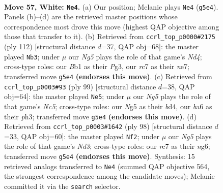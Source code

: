 \documentclass[11pt]{article}
\begin{document}
\clearpage

\begin{figure}[p]\centering
\begin{subfigure}{0.46\textwidth}\centering
\resizebox{\linewidth}{!}{%
\newchessgame
\chessboard[
  setfen={8/2r2pkp/b5p1/4P1N1/1n3Pp1/8/6KP/1B6 w - - 4 57},
  showmover=false,
  pgfstyle=straightmove, color=movearrow, markmove={g5-e4}
]}
\caption{}
\end{subfigure}\hfill
\begin{subfigure}{0.46\textwidth}\centering
\resizebox{\linewidth}{!}{%
\newchessgame
\chessboard[
  setfen={8/4n3/p1p2k2/1pP2p2/1P1N4/P2K2P1/8/8 w - - 9 57},
  showmover=false,
  pgfstyle=straightmove, color=movearrow, markmove={d4-b3}
]}
\caption{}
\end{subfigure}
\\[4pt]
\begin{subfigure}{0.46\textwidth}\centering
\resizebox{\linewidth}{!}{%
\newchessgame
\chessboard[
  setfen={8/1b3k2/5p2/pp6/2nB1N1p/P6P/1P4P1/5K2 b - - 5 50},
  showmover=false,
  pgfstyle=straightmove, color=movearrow, markmove={c4-e5}
]}
\caption{}
\end{subfigure}\hfill
\begin{subfigure}{0.46\textwidth}\centering
\resizebox{\linewidth}{!}{%
\newchessgame
\chessboard[
  setfen={1B6/8/3pk1n1/4p3/2K1Pp2/3N1P1p/8/8 w - - 0 50},
  showmover=false,
  pgfstyle=straightmove, color=movearrow, markmove={d3-f2}
]}
\caption{}
\end{subfigure}
\caption{\textbf{Move 57, White: \texttt{Ne4}.} (a) Our position; Melanie plays \texttt{Ne4} (\texttt{g5e4}). Panels (b)--(d) are the retrieved master positions whose correspondence most drove this move (highest QAP objective among those that transfer to it). (b) Retrieved from \texttt{ccrl\_top\_p0000\#2175} (ply 112) [structural distance $d$=37, QAP obj=68]: the master played \texttt{Nb3}; under $\mu$ our \emph{Ng5} plays the role of that game's \emph{Nd4}; cross-type roles: our \emph{B}b1 as their \emph{P}g3, our \emph{r}c7 as their \emph{n}e7; transferred move \texttt{g5e4} \textbf{(endorses this move)}. (c) Retrieved from \texttt{ccrl\_top\_p0003\#93} (ply 99) [structural distance $d$=38, QAP obj=64]: the master played \texttt{Ne5}; under $\mu$ our \emph{Ng5} plays the role of that game's \emph{Nc5}; cross-type roles: our \emph{N}g5 as their \emph{b}d4, our \emph{b}a6 as their \emph{p}h3; transferred move \texttt{g5e4} \textbf{(endorses this move)}. (d) Retrieved from \texttt{ccrl\_top\_p0003\#1642} (ply 98) [structural distance $d$=33, QAP obj=60]: the master played \texttt{Nf2}; under $\mu$ our \emph{Ng5} plays the role of that game's \emph{Nd3}; cross-type roles: our \emph{r}c7 as their \emph{n}g6; transferred move \texttt{g5e4} \textbf{(endorses this move)}. Synthesis: 15 retrieved analogs transferred to \texttt{Ne4} (summed QAP objective 564, the strongest correspondence among the candidate moves); Melanie committed it via the \texttt{search} selector.}
\label{fig:thought-m112}
\end{figure}
\end{document}
